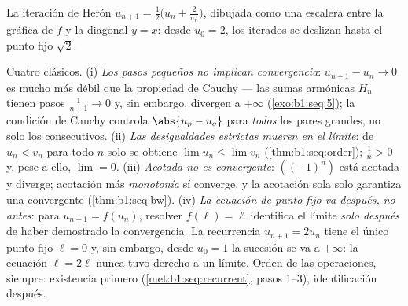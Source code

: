 \begin{omfigure}

{\small La iteración de Herón $u_{n+1} = \frac12\bigl(u_n +
\frac{2}{u_n}\bigr)$, dibujada como una escalera entre la gráfica de
$f$ y la diagonal $y = x$: desde $u_0 = 2$, los iterados se deslizan
hasta el punto fijo $\sqrt 2$.}
\end{omfigure}

\begin{remark}
Cuatro clásicos. (i) \emph{Los pasos pequeños no implican
convergencia}: $u_{n+1} - u_n \to 0$ es mucho más débil que la
propiedad de Cauchy --- las sumas armónicas $H_n$ tienen pasos
$\frac{1}{n+1} \to 0$ y, sin embargo, divergen a $+\infty$
(\cref{exo:b1:seq:5}); la condición de Cauchy controla
$\abs{u_p - u_q}$ para \emph{todos} los pares grandes, no solo los
consecutivos. (ii) \emph{Las desigualdades estrictas mueren en el
límite}: de $u_n < v_n$ para todo $n$ solo se obtiene
$\lim u_n \leq \lim v_n$ (\cref{thm:b1:seq:order}); $\frac1n > 0$ y,
pese a ello, $\lim = 0$. (iii) \emph{Acotada no es convergente}:
$((-1)^n)$ está acotada y diverge; acotación más \emph{monotonía} sí
converge, y la acotación sola solo garantiza una 
convergente (\cref{thm:b1:seq:bw}). (iv) \emph{La ecuación de punto
fijo va después, no antes}: para $u_{n+1} = f(u_n)$, resolver
$f(\ell) = \ell$ identifica el límite \emph{solo después} de haber
demostrado la convergencia. La recurrencia $u_{n+1} = 2u_n$ tiene el
único punto fijo $\ell = 0$ y, sin embargo, desde $u_0 = 1$ la
sucesión se va a $+\infty$: la ecuación $\ell = 2\ell$ nunca tuvo
derecho a un límite. Orden de las operaciones, siempre: existencia
primero (\cref{met:b1:seq:recurrent}, pasos 1--3), identificación
después.
\end{remark}

